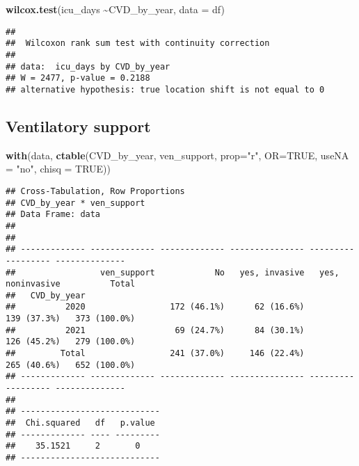 \documentclass[
]{article}
\newenvironment{Shaded}{\begin{snugshade}}{\end{snugshade}}
\newcommand{\AttributeTok}[1]{\textcolor[rgb]{0.13,0.29,0.53}{#1}}
\newcommand{\ConstantTok}[1]{\textcolor[rgb]{0.56,0.35,0.01}{#1}}
\newcommand{\FunctionTok}[1]{\textcolor[rgb]{0.13,0.29,0.53}{\textbf{#1}}}
\newcommand{\NormalTok}[1]{#1}
\newcommand{\SpecialCharTok}[1]{\textcolor[rgb]{0.81,0.36,0.00}{\textbf{#1}}}
\newcommand{\StringTok}[1]{\textcolor[rgb]{0.31,0.60,0.02}{#1}}
\begin{document}
\begin{Shaded}
\begin{Highlighting}[]
\FunctionTok{wilcox.test}\NormalTok{(icu\_days }\SpecialCharTok{\textasciitilde{}}\NormalTok{CVD\_by\_year, }\AttributeTok{data =}\NormalTok{ df)}
\end{Highlighting}
\end{Shaded}

\begin{verbatim}
## 
##  Wilcoxon rank sum test with continuity correction
## 
## data:  icu_days by CVD_by_year
## W = 2477, p-value = 0.2188
## alternative hypothesis: true location shift is not equal to 0
\end{verbatim}

\hypertarget{ventilatory-support}{%
\subsection{Ventilatory support}\label{ventilatory-support}}

\begin{Shaded}
\begin{Highlighting}[]
\FunctionTok{with}\NormalTok{(data, }\FunctionTok{ctable}\NormalTok{(CVD\_by\_year, ven\_support, }\AttributeTok{prop=}\StringTok{"r"}\NormalTok{, }\AttributeTok{OR=}\ConstantTok{TRUE}\NormalTok{, }\AttributeTok{useNA =} \StringTok{"no"}\NormalTok{, }\AttributeTok{chisq =} \ConstantTok{TRUE}\NormalTok{))}
\end{Highlighting}
\end{Shaded}

\begin{verbatim}
## Cross-Tabulation, Row Proportions  
## CVD_by_year * ven_support  
## Data Frame: data  
## 
## 
## ------------- ------------- ------------- --------------- ------------------ --------------
##                 ven_support            No   yes, invasive   yes, noninvasive          Total
##   CVD_by_year                                                                              
##          2020                 172 (46.1%)      62 (16.6%)        139 (37.3%)   373 (100.0%)
##          2021                  69 (24.7%)      84 (30.1%)        126 (45.2%)   279 (100.0%)
##         Total                 241 (37.0%)     146 (22.4%)        265 (40.6%)   652 (100.0%)
## ------------- ------------- ------------- --------------- ------------------ --------------
## 
## ----------------------------
##  Chi.squared   df   p.value 
## ------------- ---- ---------
##    35.1521     2       0    
## ----------------------------
\end{verbatim}
\end{document}
